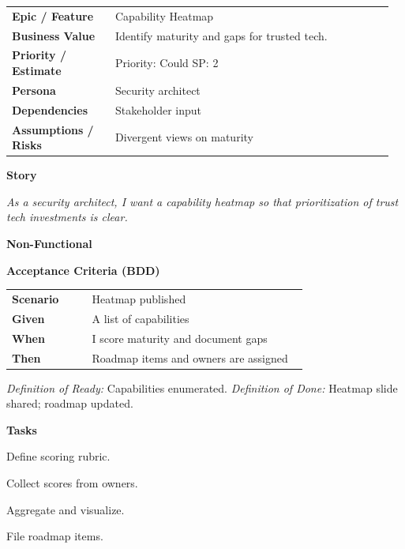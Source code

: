 \documentclass[11pt,letterpaper]{article}
\makeatletter
\newenvironment{kvtable}{%
  \par\noindent\begin{tabular}{@{}>{\raggedright\bfseries\arraybackslash}p{0.26\linewidth} >{\raggedright\arraybackslash}p{0.70\linewidth}@{}}
}{\end{tabular}\par}
\newenvironment{bdd}{%
  \par\noindent\begin{tabular}{@{}>{\raggedright\bfseries\arraybackslash}p{0.26\linewidth} >{\raggedright\arraybackslash}p{0.70\linewidth}@{}}
}{\end{tabular}\par}
\newcommand{\DoRDoD}[2]{%
  \vspace{0.35em}
  {\footnotesize\color{Muted}%
    \textit{Definition of Ready:} #1 \; \textbullet\;
    \textit{Definition of Done:} #2%
  }%
}
\newenvironment{storycard}[2]{%
  \begin{tcolorbox}[cloudcard, title={#1 --- #2}]%
}{\end{tcolorbox}}
\newcommand{\sectionlabel}[1]{\par\vspace{0.35em}\textbf{#1}\par}
\makeatother
\begin{document}
\begin{storycard}{CCS-25}{Ch. 25 — Trusted Security Tech: Survey \& Gaps}
\begin{kvtable}
Epic / Feature & Capability Heatmap\\
Business Value & Identify maturity and gaps for trusted tech.\\
Priority / Estimate & Priority: Could \quad SP: 2\\
Persona & Security architect\\
Dependencies & Stakeholder input\\
Assumptions / Risks & Divergent views on maturity\\
\end{kvtable}
\sectionlabel{Story}
\textit{As a security architect, I want a capability heatmap so that prioritization of trust tech investments is clear.}
\sectionlabel{Non-Functional}\;
\sectionlabel{Acceptance Criteria (BDD)}
\begin{bdd}
Scenario & Heatmap published\\
Given & A list of capabilities\\
When & I score maturity and document gaps\\
Then & Roadmap items and owners are assigned\\
\end{bdd}
\DoRDoD{Capabilities enumerated.}{Heatmap slide shared; roadmap updated.}
\sectionlabel{Tasks}
\begin{checklist}
\item Define scoring rubric.
\item Collect scores from owners.
\item Aggregate and visualize.
\item File roadmap items.
\end{checklist}
\end{storycard}
\end{document}
